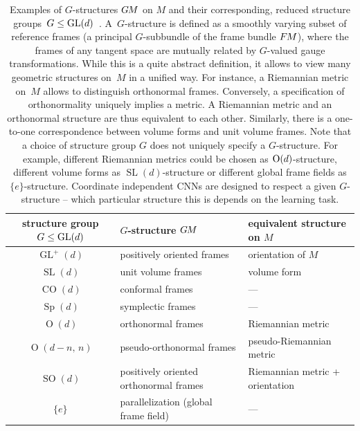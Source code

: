 \begin{table}
    \centering
    \renewcommand\arraystretch{1.1}
    \small
    \begin{tabular}{cll}
       \toprule
       structure group $G\leq\operatorname{GL}(d)$ & $G$-structure $G\mkern-1.4muM$                      & equivalent structure on $M$       \\[.25ex]
       \midrule
       $\operatorname{GL}^+(d)$      & positively oriented frames               & orientation of $M$                \\
       $\operatorname{SL}(d)$        & unit volume frames                       & volume form                       \\
       $\operatorname{CO}(d)$        & conformal frames                         & ---                                \\
       $\operatorname{Sp}(d)$        & symplectic frames                        & ---                                \\
       $\operatorname{O}(d)$         & orthonormal frames                       & Riemannian metric                 \\
       $\operatorname{O}(d-n,\,n)$   & pseudo-orthonormal frames                & pseudo-Riemannian metric          \\
       $\operatorname{SO}(d)$        & positively oriented orthonormal frames   & Riemannian metric + orientation   \\
       $\{e\}$                       & parallelization (global frame field)     & ---                                \\[.25ex]
       \bottomrule
    \end{tabular}
    \vspace*{2ex}
    \caption{
        Examples of $G$-structures $G\mkern-1.4muM$ on $M$ and their corresponding, reduced structure groups~$G\leq\operatorname{GL}(d)$~\cite{kobayashi1972transformation}.
        A~$G$-structure is defined as a smoothly varying subset of reference frames (a principal $G$-subbundle of the frame bundle $F\mkern-1.5muM$), where the frames of any tangent space are mutually related by $G$-valued gauge transformations.
        While this is a quite abstract definition, it allows to view many geometric structures on~$M$ in a unified way.
        For instance, a Riemannian metric on~$M$ allows to distinguish orthonormal frames.
        Conversely, a specification of orthonormality uniquely implies a metric.
        A Riemannian metric and an orthonormal structure are thus equivalent to each other.
        Similarly, there is a one-to-one correspondence between volume forms and unit volume frames.
        Note that a choice of structure group $G$ does not uniquely specify a $G$-structure.
        For example, different Riemannian metrics could be chosen as $\operatorname{O}(d)$-structure, different volume forms as $\operatorname{SL}(d)$-structure or different global frame fields as $\{e\}$-structure.
        Coordinate independent CNNs are designed to respect a given $G$-structure -- which particular structure this is depends on the learning task.
    }
    \label{tab:G_structures}
\end{table}


